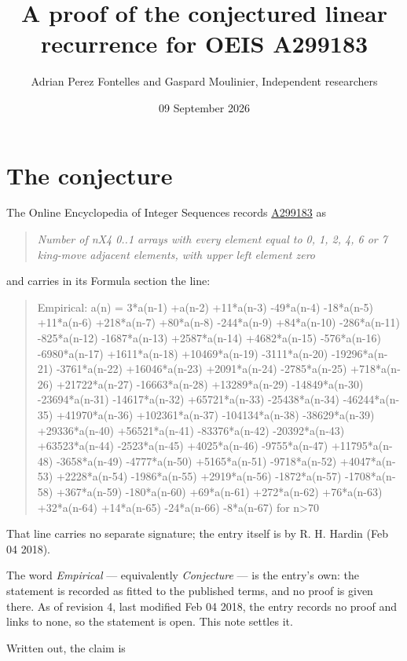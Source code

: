 \documentclass[11pt]{article}
\title{A proof of the conjectured linear recurrence for OEIS A299183}
\author{Adrian Perez Fontelles and Gaspard Moulinier, Independent researchers}
\date{09 September 2026}
\theoremstyle{definition}
\begin{document}
\maketitle
\section{The conjecture}

The Online Encyclopedia of Integer Sequences records \href{https://oeis.org/A299183}{A299183} as

\begin{quote}\itshape Number of nX4 0..1 arrays with every element equal to 0, 1, 2, 4, 6 or 7 king-move adjacent elements, with upper left element zero\end{quote}

and carries in its Formula section the line:

\begin{quote}\ttfamily Empirical: a(n) = 3*a(n-1) +a(n-2) +11*a(n-3) -49*a(n-4) -18*a(n-5) +11*a(n-6) +218*a(n-7) +80*a(n-8) -244*a(n-9) +84*a(n-10) -286*a(n-11) -825*a(n-12) -1687*a(n-13) +2587*a(n-14) +4682*a(n-15) -576*a(n-16) -6980*a(n-17) +1611*a(n-18) +10469*a(n-19) -3111*a(n-20) -19296*a(n-21) -3761*a(n-22) +16046*a(n-23) +2091*a(n-24) -2785*a(n-25) +718*a(n-26) +21722*a(n-27) -16663*a(n-28) +13289*a(n-29) -14849*a(n-30) -23694*a(n-31) -14617*a(n-32) +65721*a(n-33) -25438*a(n-34) -46244*a(n-35) +41970*a(n-36) +102361*a(n-37) -104134*a(n-38) -38629*a(n-39) +29336*a(n-40) +56521*a(n-41) -83376*a(n-42) -20392*a(n-43) +63523*a(n-44) -2523*a(n-45) +4025*a(n-46) -9755*a(n-47) +11795*a(n-48) -3658*a(n-49) -4777*a(n-50) +5165*a(n-51) -9718*a(n-52) +4047*a(n-53) +2228*a(n-54) -1986*a(n-55) +2919*a(n-56) -1872*a(n-57) -1708*a(n-58) +367*a(n-59) -180*a(n-60) +69*a(n-61) +272*a(n-62) +76*a(n-63) +32*a(n-64) +14*a(n-65) -24*a(n-66) -8*a(n-67) for n>70\end{quote}

That line carries no separate signature; the entry itself is by R. H. Hardin (Feb 04 2018).

The word {\itshape Empirical} --- equivalently {\itshape Conjecture} --- is the entry's own: the statement is recorded as fitted to the published terms, and no proof is given there. As of revision 4, last modified Feb 04 2018, the entry records no proof and links to none, so the statement is open. This note settles it.

Written out, the claim is
\end{document}

